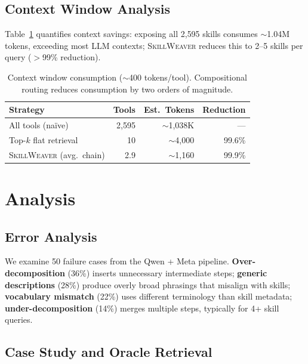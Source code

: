 \documentclass[11pt]{article}
\newcommand{\system}{\textsc{SkillWeaver}}
\begin{document}
\subsection{Context Window Analysis}
\label{sec:context}

Table~\ref{tab:context} quantifies context savings: exposing all 2{,}595 skills consumes $\sim$1.04M tokens, exceeding most LLM contexts; \system{} reduces this to 2--5 skills per query ($>$99\% reduction).

\begin{table}[t]
\centering
\small
\begin{tabular}{@{}lrrr@{}}
\toprule
\textbf{Strategy} & \textbf{Tools} & \textbf{Est.\ Tokens} & \textbf{Reduction} \\
\midrule
All tools (na\"ive) & 2{,}595 & $\sim$1{,}038K & --- \\
Top-$k$ flat retrieval & 10 & $\sim$4{,}000 & 99.6\% \\
\system{} (avg.\ chain) & 2.9 & $\sim$1{,}160 & 99.9\% \\
\bottomrule
\end{tabular}
\caption{Context window consumption (${\sim}$400 tokens/tool). Compositional routing reduces consumption by two orders of magnitude.}
\label{tab:context}
\end{table}

\section{Analysis}
\label{sec:analysis}

\subsection{Error Analysis}

We examine 50 failure cases from the Qwen + Meta pipeline.
\textbf{Over-decomposition} (36\%) inserts unnecessary intermediate steps;
\textbf{generic descriptions} (28\%) produce overly broad phrasings that misalign with skills;
\textbf{vocabulary mismatch} (22\%) uses different terminology than skill metadata;
\textbf{under-decomposition} (14\%) merges multiple steps, typically for 4+ skill queries.

\subsection{Case Study and Oracle Retrieval}
\end{document}
